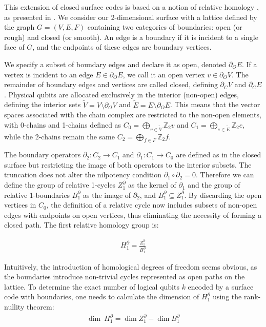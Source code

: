 \documentclass[12pt, twoside, openany]{book}
\begin{document}
This extension of closed surface codes is based on a notion of relative homology \cite{massey1977algebraic}, as presented in \cite{delfosse2016generalizedsurfacecodespacking}. We consider our 2-dimensional surface with a lattice defined by the graph $G=(V,E,F)$ containing two categories of boundaries: open (or rough) and closed (or smooth). An edge is a boundary if it is incident to a single face of $G$, and the endpoints of these edges are boundary vertices. 

We specify a subset of boundary edges and declare it as open, denoted $\partial_O E$. If a vertex is incident to an edge $E \in \partial_O E$, we call it an open vertex $v \in \partial_O V$. The remainder of boundary edges and vertices are called closed, defining $\partial_C V$ and $\partial_C E$. Physical qubits are allocated exclusively in the interior (non-open) edges, defining the interior sets $\tilde{V} = V \setminus \partial_OV$ and $\tilde{E} = E \setminus \partial_OE$. This means that the vector spaces associated with the chain complex are restricted to the non-open elements, with 0-chains and 1-chains defined as $C_0 = \bigoplus_{v \in \tilde{V}} \mathbb{Z}_2 v$ and $C_1 = \bigoplus_{e \in \tilde{E}} \mathbb{Z}_2 e$, while the 2-chains remain the same $C_2 = \bigoplus_{f \in F} \mathbb{Z}_2 f$.

The boundary operators $\partial_2 : C_2 \rightarrow C_1$  and $\partial_1 : C_1 \rightarrow C_0$ are defined as in the closed surface but restricting the image of both operators to the interior subsets. The truncation does not alter the nilpotency condition $\partial_1 \circ \partial_2 = 0$. Therefore we can define the group of relative 1-cycles $Z_1^\partial$ as the kernel of $\partial_1$ and the group of relative 1-boundaries $B_1^\partial$ as the image of $\partial_2$, and $B_1^\partial \subseteq Z_1^\partial$. By discarding the open vertices in $C_0$, the definition of a relative cycle now includes subsets of non-open edges with endpoints on open vertices, thus eliminating the necessity of forming a closed path. The first relative homology group is:

\begin{align}
    H_1^\partial = \frac{Z_1^\partial}{B_1^\partial}
\end{align}

Intuitively, the introduction of homological degrees of freedom seems obvious, as the boundaries introduce non-trivial cycles represented as open paths on the lattice. To determine the exact number of logical qubits $k$ encoded by a surface code with boundaries, one needs to calculate the dimension of $H_1^{\partial}$ using the rank-nullity theorem:
\begin{align} \label{dimHZB}
    \dim \ H_1^\partial = \dim  Z_1^\partial - \dim  B_1^\partial
\end{align}
\end{document}
